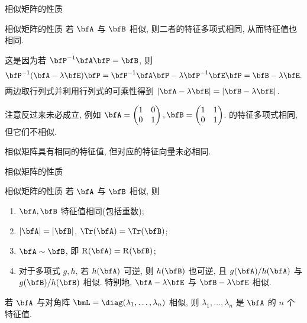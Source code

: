 \begin{frame}{相似矩阵的性质}
	\onslide<+->
	\begin{algorithm}{相似矩阵的性质}
		若 $\bfA$ 与 $\bfB$ 相似, 则二者的特征多项式相同, 从而特征值也相同.
	\end{algorithm}
	\onslide<+->
	这是因为若 $\bfP^{-1}\bfA\bfP=\bfB$, 则
	\[\bfP^{-1}(\bfA-\lambda\bfE)\bfP=\bfP^{-1}\bfA\bfP-\lambda\bfP^{-1}\bfE\bfP=\bfB-\lambda\bfE.\]
	\onslide<+->
	两边取行列式并利用行列式的可乘性得到 $|\bfA-\lambda\bfE|=|\bfB-\lambda\bfE|$.

	\onslide<+->
	注意反过来未必成立, 例如 $\bfA=\begin{pmatrix}
		1&0\\
		0&1
	\end{pmatrix}, \bfB=\begin{pmatrix}
		1&1\\
		0&1
	\end{pmatrix}$.
	的特征多项式相同, 但它们不相似.

	\onslide<+->
	相似矩阵具有相同的特征值, 但对应的特征向量未必相同.
\end{frame}


\begin{frame}{相似矩阵的性质}
	\onslide<+->
	\begin{algorithm}{相似矩阵的性质}
		若 $\bfA$ 与 $\bfB$ 相似, 则
		\begin{enumerate}
			\item \alert{$\bfA,\bfB$ 特征值相同(包括重数)};
			\item \alert{$|\bfA|=|\bfB|$, $\Tr(\bfA)=\Tr(\bfB)$};
			\item $\bfA\sim\bfB$, 即 \alert{$\rank(\bfA)=\rank(\bfB)$};
			\item 对于多项式 $g,h$, 若 $h(\bfA)$ 可逆, 则 $h(\bfB)$ 也可逆, 且 $g(\bfA)/h(\bfA)$ 与 $g(\bfB)/h(\bfB)$ 相似.
			特别地, $\bfA-\lambda\bfE$ 与 $\bfB-\lambda\bfE$ 相似.
		\end{enumerate}
	\end{algorithm}
	\onslide<+->
	\begin{corollary}
		若 $\bfA$ 与对角阵 $\bmL=\diag(\lambda_1,\dots,\lambda_n)$ 相似, 则 $\lambda_1,\dots,\lambda_n$ 是 $\bfA$ 的 $n$ 个特征值.
	\end{corollary}
\end{frame}


